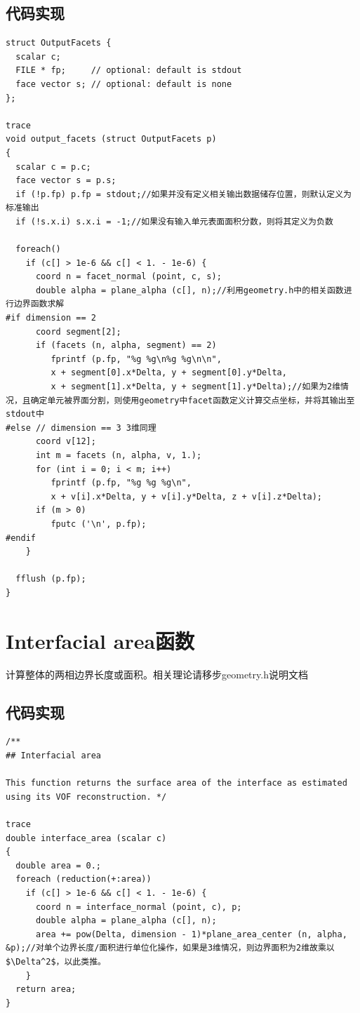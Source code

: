 \documentclass[lang=cn,11pt,a4paper]{elegantpaper}
\begin{document}
\subsection{代码实现}
\begin{verbatim}
struct OutputFacets {
  scalar c;
  FILE * fp;     // optional: default is stdout
  face vector s; // optional: default is none
};

trace
void output_facets (struct OutputFacets p)
{
  scalar c = p.c;
  face vector s = p.s;
  if (!p.fp) p.fp = stdout;//如果并没有定义相关输出数据储存位置，则默认定义为标准输出
  if (!s.x.i) s.x.i = -1;//如果没有输入单元表面面积分数，则将其定义为负数

  foreach()
    if (c[] > 1e-6 && c[] < 1. - 1e-6) {
      coord n = facet_normal (point, c, s);
      double alpha = plane_alpha (c[], n);//利用geometry.h中的相关函数进行边界函数求解
#if dimension == 2      
      coord segment[2];
      if (facets (n, alpha, segment) == 2)
         fprintf (p.fp, "%g %g\n%g %g\n\n", 
         x + segment[0].x*Delta, y + segment[0].y*Delta, 
         x + segment[1].x*Delta, y + segment[1].y*Delta);//如果为2维情况，且确定单元被界面分割，则使用geometry中facet函数定义计算交点坐标，并将其输出至stdout中
#else // dimension == 3 3维同理
      coord v[12];
      int m = facets (n, alpha, v, 1.);
      for (int i = 0; i < m; i++)
         fprintf (p.fp, "%g %g %g\n",
         x + v[i].x*Delta, y + v[i].y*Delta, z + v[i].z*Delta);
      if (m > 0)
         fputc ('\n', p.fp);
#endif
    }

  fflush (p.fp);
}
\end{verbatim}
\section{Interfacial area函数}\label{sec:interfacial}
计算整体的两相边界长度或面积。相关理论请移步geometry.h说明文档
\subsection{代码实现}
\begin{verbatim}
/**
## Interfacial area

This function returns the surface area of the interface as estimated
using its VOF reconstruction. */

trace
double interface_area (scalar c)
{
  double area = 0.;
  foreach (reduction(+:area))
    if (c[] > 1e-6 && c[] < 1. - 1e-6) {
      coord n = interface_normal (point, c), p;
      double alpha = plane_alpha (c[], n);
      area += pow(Delta, dimension - 1)*plane_area_center (n, alpha, &p);//对单个边界长度/面积进行单位化操作，如果是3维情况，则边界面积为2维故乘以$\Delta^2$，以此类推。
    }
  return area;
}
\end{verbatim}
\printbibliography[heading=bibintoc, title=\ebibname]
\end{document}
